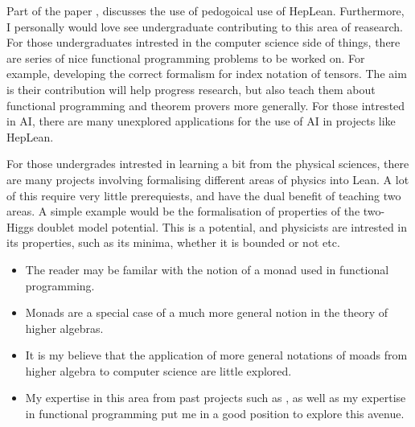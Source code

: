 \documentclass[14pt,letter]{article}
\newcounter{customtitle}
\begin{document}

Part of the paper , discusses the use of pedogoical use 
of HepLean.   
Furthermore, I personally would love see undergraduate contributing to 
this area of reasearch. For those undergraduates intrested in the 
computer science side of things, there are series of nice 
functional programming problems to be worked on. For example, 
developing the correct formalism for index notation of tensors. 
The aim is their contribution will help progress research, but also 
teach them about functional programming and theorem provers more generally. 
For those intrested in AI, there are many unexplored applications 
for the use of AI in projects like HepLean. 

For those undergrades intrested in learning a bit from the physical sciences, 
there are many projects involving formalising different areas of 
physics into Lean. A lot of this require very little prerequiests, and have
the dual benefit of teaching two areas. A simple example would 
be the formalisation of properties of the two-Higgs doublet model potential. 
This is a potential, and physicists are intrested in its properties, 
such as its minima, whether it is bounded or not etc.



\begin{itemize}
\item The reader may be familar with the notion of a monad used in functional programming.
\item Monads are a special case of a much more general notion in the theory of higher algebras. 
\item It is my believe that the application of more general notations of moads from higher algebra to computer science 
are little explored. 
\item My expertise in this area from past projects such as , as well as my expertise in functional programming
 put me in a good position to explore this avenue.
\end{itemize}
\end{document}
